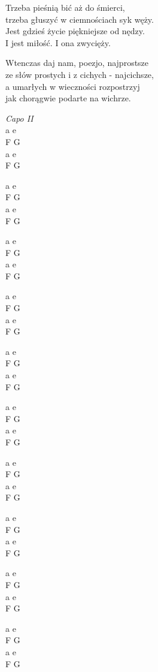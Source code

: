 \begin{text}
    Trzeba pieśnią bić aż do śmierci,\\
    trzeba głuszyć w ciemnościach syk węży.\\
    Jest gdzieś życie piękniejsze od nędzy.\\
    I jest miłość. I ona zwycięży.
    
    Wtenczas daj nam, poezjo, najprostsze\\
    ze słów prostych i z cichych - najcichsze,\\
    a umarłych w wieczności rozpostrzyj\\
    jak chorągwie podarte na wichrze.
\end{text}
\hfill
\begin{chord}
    \textit{Capo II}\\
    a e\\
    F G\\
    a e\\
    F G

    a e\\
    F G\\
    a e\\
    F G
    
    a e\\
    F G\\
    a e\\
    F G

    a e\\
    F G\\
    a e\\
    F G
    
    a e\\
    F G\\
    a e\\
    F G
    
    a e\\
    F G\\
    a e\\
    F G

    a e\\
    F G\\
    a e\\
    F G
    
    a e\\
    F G\\
    a e\\
    F G
    
    a e\\
    F G\\
    a e\\
    F G

    a e\\
    F G\\
    a e\\
    F G
\end{chord}
